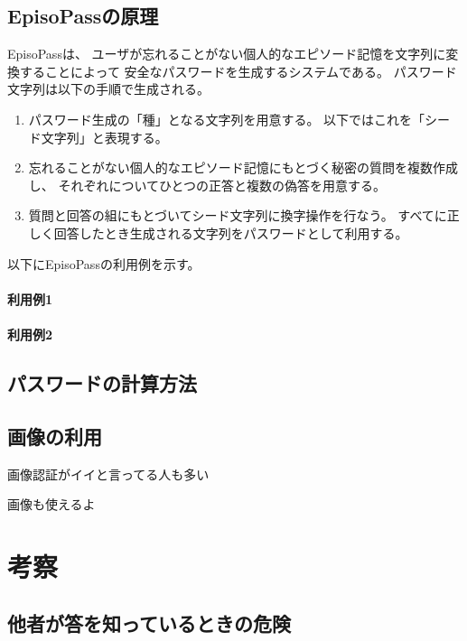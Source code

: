 \documentclass[twoside]{wiss}
\begin{document}
\subsection{EpisoPassの原理}

EpisoPassは、
ユーザが忘れることがない個人的なエピソード記憶を文字列に変換することによって
安全なパスワードを生成するシステムである。
パスワード文字列は以下の手順で生成される。

\begin{enumerate}
\item パスワード生成の「種」となる文字列を用意する。
以下ではこれを「シード文字列」と表現する。
\item 忘れることがない個人的なエピソード記憶にもとづく秘密の質問を複数作成し、
それぞれについてひとつの正答と複数の偽答を用意する。
\item 質問と回答の組にもとづいてシード文字列に換字操作を行なう。
すべてに正しく回答したとき生成される文字列をパスワードとして利用する。
\end{enumerate}

以下にEpisoPassの利用例を示す。

\paragraph{利用例1}

\paragraph{利用例2}

\subsection{パスワードの計算方法}

\subsection{画像の利用}

画像認証がイイと言ってる人も多い

画像も使えるよ

\section{考察}

\subsection{他者が答を知っているときの危険}
\end{document}
